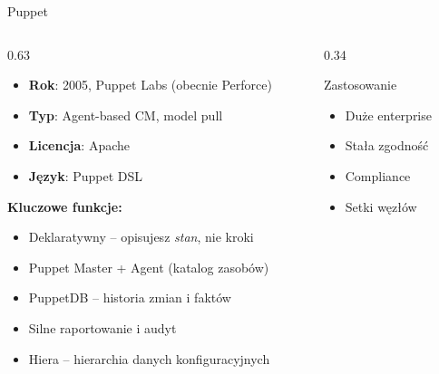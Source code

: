 \documentclass{beamer}
\begin{document}
\begin{frame}{Puppet}
    \begin{columns}[T]
        \begin{column}{0.63\textwidth}
            \begin{itemize}
                \item \textbf{Rok}: 2005, Puppet Labs (obecnie Perforce)
                \item \textbf{Typ}: Agent-based CM, model pull
                \item \textbf{Licencja}: Apache
                \item \textbf{J\k{e}zyk}: Puppet DSL
            \end{itemize}
            \vspace{0.4em}
            \textbf{Kluczowe funkcje:}
            \begin{itemize}
                \item Deklaratywny -- opisujesz \textit{stan}, nie kroki
                \item Puppet Master + Agent (katalog zasob\'ow)
                \item PuppetDB -- historia zmian i fakt\'ow
                \item Silne raportowanie i audyt
                \item Hiera -- hierarchia danych konfiguracyjnych
            \end{itemize}
        \end{column}
        \begin{column}{0.34\textwidth}
            \begin{block}{Zastosowanie}
                \begin{itemize}
                    \item Du\.ze enterprise
                    \item Sta\l{}a zgodno\'s\'c
                    \item Compliance
                    \item Setki w\k{e}z\l{}\'ow
                \end{itemize}
            \end{block}
        \end{column}
    \end{columns}
\end{frame}
\end{document}
